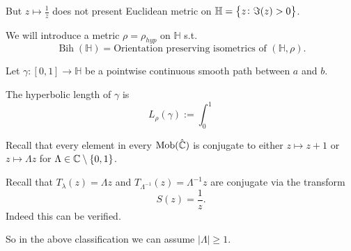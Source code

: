 \documentclass[11pt,a4paper]{article}
\DeclareMathOperator{\Bih}{Bih}
\renewcommand{\H}{\mathbb H}
\DeclareMathOperator{\Mob}{Mob}
\begin{document}
But $z \mapsto \frac 1z$ does not present Euclidean metric on 
$\H = \set{z \colon \Im(z) > 0}$.

We will introduce a metric $\rho = \rho_{hyp}$ on $\H$ s.t.\
\[
  \Bih(\H) = \text{Orientation preserving isometrics of } (\H,\rho).
\]

\begin{definition}[Length]
  Let $\gamma \colon [0,1] \to \H$ be a pointwise continuous smooth path
  between $a$ and $b$.

  The hyperbolic length of $\gamma$ is
  \[
    L_{\rho}(\gamma) :=
    \int_0^1 
  \]
\end{definition}


Recall that every element in every $\Mob(\hat \C)$ is conjugate
to either $z \mapsto z + 1$ or $z \mapsto \Lambda z$ for
$\Lambda \in \mathbb{C} \setminus \set{0,1}$.

Recall that $T_{\lambda}(z)= \Lambda z$ and
$T_{\Lambda^{-1}}(z) = \Lambda^{-1} z$ are conjugate via the transform
\[
  S(z) = \frac{1}{z}.
\]
Indeed this can be verified.

So in the above classification we can assume $|\Lambda| \geq 1$.
\end{document}

